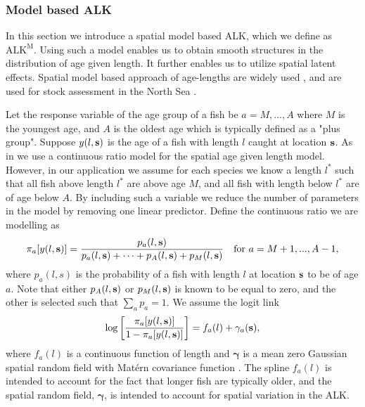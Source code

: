 \documentclass[a4paper 12pt]{article}
\numberwithin{equation}{section}
\begin{document}
\subsubsection{Model based ALK}
\label{sec:spatialModelALK}
In this section we introduce a spatial model based ALK, which we define as $\mathrm{ALK^M}$. Using such a model enables us to obtain smooth structures in the distribution of age given length. It further enables us to utilize spatial latent effects. Spatial model based approach of age-lengths are widely used \citep{berg2012spatial, hirst2012bayesian, rindorf2001analyses}, and are used for stock assessment in the North Sea \citep{berg2014evaluation}.  %

Let the response variable of the age group of a fish be $a = M,...,A$ where $M$ is the youngest age, and $A$ is the oldest age which is typically defined as a "plus group". Suppose $y(l,{\bf s})$ is the age  of a fish with length $l$ caught at location ${\bf s}$. As in \citet{berg2012spatial} we use a continuous ratio model for the spatial age given length model. However, in our application we assume for each species we know a length $l^*$ such that all fish above length $l^*$ are above age $M$, and all fish with length below $l^*$ are of age below $A$. By including such a variable we reduce the number of parameters in the model by removing one linear predictor. Define the continuous ratio we are modelling as
\begin{equation}\label{eq:linearPred1}
\pi_a[y(l,{\bf s})] = \frac{p_a(l,{\bf s})}{p_a(l,{\bf s}) + \cdots + p_{A}(l,{\bf s}) +p_{M}(l,{\bf s}) } \vspace{ 4mm} \ \ \ \text{for } a =M+1,...,A-1 ,
\end{equation}
where \vspace{-5mm} $p_a(l,s)$ is the probability of a fish with length $l$ at location ${\bf s}$ to be of age $a$.  Note  that either $p_{A}(l,{\bf s})$ or $p_{M}(l,{\bf s})$ is known to be equal to zero, and the other is selected such that $\sum_a p_a = 1$. We assume the logit link
\begin{equation}\label{eq:linearPred}
\log \left[ \frac{\pi_a[y(l,{\bf s})]}{1-\pi_a[y(l,{\bf s})]}\right] = f_a(l) + \gamma_a({\bf s}),
\end{equation}
where $ f_a(l)$ is a continuous function of length and $\pmb{\gamma}$ is a mean zero Gaussian spatial random field with Mat\'{e}rn covariance function \citep{stein2012interpolation}. The spline $f_a (l)$ is intended to account for the fact that longer fish are typically older, and the spatial random field, $\pmb{\gamma}$, is intended to account for spatial variation in the ALK. 
\end{document}
